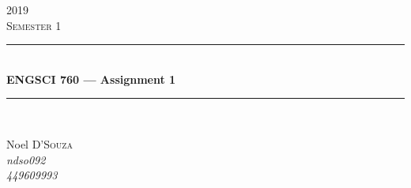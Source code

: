 \documentclass[12pt]{article}
\begin{document}
\begin{titlepage} %
	\newcommand{\HRule}{\rule{\linewidth}{0.5mm}} %
	\center %
	
    
	\textsc{\LARGE 2019}\\[1.5cm] %
	\textsc{\Large Semester 1}\\[0.5cm] %
	
	
	\HRule\\[0.4cm]
	{\huge\bfseries ENGSCI 760 --- Assignment 1}\\[0.4cm] %
	\HRule\\[1cm]
	
	
    \begin{minipage}[t]{0.4\textwidth}
        \vspace{0pt}
		\begin{center}
			\large
			Noel \textsc{D'Souza}\\ %
			\textit{ndso092}\\
			\textit{449609993}
		\end{center}
	\end{minipage}
	~


\end{titlepage}
\end{document}
